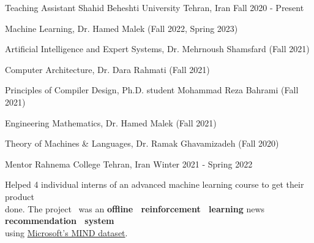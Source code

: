 

\begin{cventries}

  \cventry%
    {Teaching Assistant} %
    {Shahid Beheshti University} %
    {Tehran, Iran} %
    {Fall 2020 - Present} %
    {%
      \begin{cvitems} %
        \item {Machine Learning, Dr. Hamed Malek (Fall 2022, Spring 2023)}
        \item {Artificial Intelligence and Expert Systems, Dr. Mehrnoush Shamsfard (Fall 2021)}
        \item {Computer Architecture, Dr. Dara Rahmati (Fall 2021)}
        \item {Principles of Compiler Design, Ph.D. student Mohammad Reza Bahrami (Fall 2021)}
        \item {Engineering Mathematics, Dr. Hamed Malek (Fall 2021)}
        \item {Theory of Machines \& Languages, Dr. Ramak Ghavamizadeh (Fall 2020)}
      \end{cvitems}
    }


  \cventry%
    {Mentor} %
    {Rahnema College} %
    {Tehran, Iran} %
    {Winter 2021 - Spring 2022} %
    {%
      \begin{cvitems} %
        \item {Helped 4 individual interns of an advanced machine learning course to get their product \\done. The project \ was an {\textbf{offline \ reinforcement \ learning}} news {\textbf{recommendation \ system}} \\using \href{https://msnews.github.io/}{Microsoft's MIND dataset}.}
      \end{cvitems}
    }


\end{cventries}
